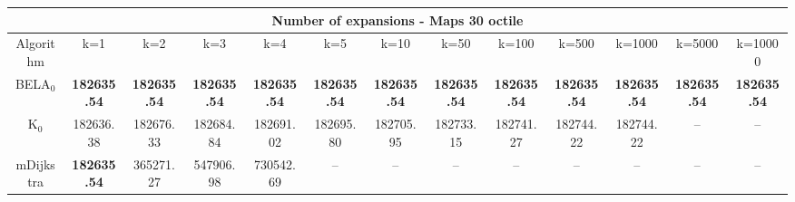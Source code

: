 \begin{tabular}{c|cccccccccccc}\toprule
\multicolumn{13}{c}{Number of expansions - Maps 30 octile}\\ \midrule
Algorithm & k=1 & k=2 & k=3 & k=4 & k=5 & k=10 & k=50 & k=100 & k=500 & k=1000 & k=5000 & k=10000 \\ \midrule
BELA$_0$ & \textbf{182635.54} & \textbf{182635.54} & \textbf{182635.54} & \textbf{182635.54} & \textbf{182635.54} & \textbf{182635.54} & \textbf{182635.54} & \textbf{182635.54} & \textbf{182635.54} & \textbf{182635.54} & \textbf{182635.54} & \textbf{182635.54} \\
K$_0$ & 182636.38 & 182676.33 & 182684.84 & 182691.02 & 182695.80 & 182705.95 & 182733.15 & 182741.27 & 182744.22 & 182744.22 & -- & -- \\
mDijkstra & \textbf{182635.54} & 365271.27 & 547906.98 & 730542.69 & -- & -- & -- & -- & -- & -- & -- & -- \\ \bottomrule 
\end{tabular}
